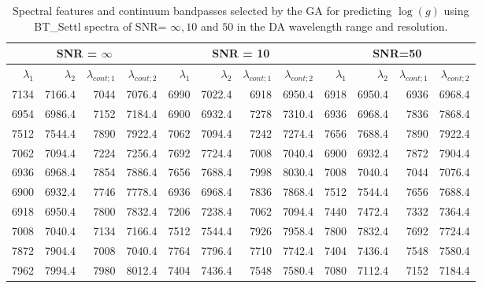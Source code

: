 \begin{table*}
\begin{center}
\begin{tabular}{rrrr | rrrr | rrrr}
  \hline
 \multicolumn{4}{c}{SNR = $\infty $} & \multicolumn{4}{c}{SNR = 10} &  \multicolumn{4}{c}{SNR=50} \\
  \hline
$\lambda_1$ & $\lambda_2$ & $\lambda_{cont;1}$ & $\lambda_{cont;2} $ & $\lambda_1$ & $\lambda_2$ & $\lambda_{cont;1}$ & $\lambda_{cont;2} $ & $\lambda_1$ & $\lambda_2$ & $\lambda_{cont;1}$ & $\lambda_{cont;2} $ \\ 
  \hline
7134 & 7166.4 &	7044 & 7076.4 & 6990 & 7022.4 &	6918 & 6950.4 & 6918 & 6950.4 & 6936 & 6968.4  \\
6954 & 6986.4 &	7152 & 7184.4 & 6900 & 6932.4 &	7278 & 7310.4 & 6936 & 6968.4 & 7836 & 7868.4  \\
7512 & 7544.4 &	7890 & 7922.4 & 7062 & 7094.4 &	7242 & 7274.4 & 7656 & 7688.4 & 7890 & 7922.4  \\
7062 & 7094.4 &	7224 & 7256.4 & 7692 & 7724.4 &	7008 & 7040.4 & 6900 & 6932.4 & 7872 & 7904.4  \\
6936 & 6968.4 &	7854 & 7886.4 & 7656 & 7688.4 &	7998 & 8030.4 & 7008 & 7040.4 & 7044 & 7076.4  \\
6900 & 6932.4 &	7746 & 7778.4 & 6936 & 6968.4 &	7836 & 7868.4 & 7512 & 7544.4 & 7656 & 7688.4  \\
6918 & 6950.4 &	7800 & 7832.4 & 7206 & 7238.4 &	7062 & 7094.4 & 7440 & 7472.4 & 7332 & 7364.4  \\
7008 & 7040.4 &	7134 & 7166.4 & 7512 & 7544.4 &	7926 & 7958.4 & 7800 & 7832.4 & 7692 & 7724.4  \\
7872 & 7904.4 &	7008 & 7040.4 & 7764 & 7796.4 &	7710 & 7742.4 & 7404 & 7436.4 & 7548 & 7580.4  \\
7962 & 7994.4 &	7980 & 8012.4 & 7404 & 7436.4 &	7548 & 7580.4 & 7080 & 7112.4 & 7152 & 7184.4  \\
   \hline
\end{tabular}
\caption {Spectral features and continuum bandpasses selected by the
  GA for predicting $\log(g)$ using BT\_Settl spectra of SNR= $\infty , 10 $ and $ 50 $
  in the DA wavelength range and
  resolution.} \label{tab:ipac-logg-noisy}
\end{center}
\end{table*}


